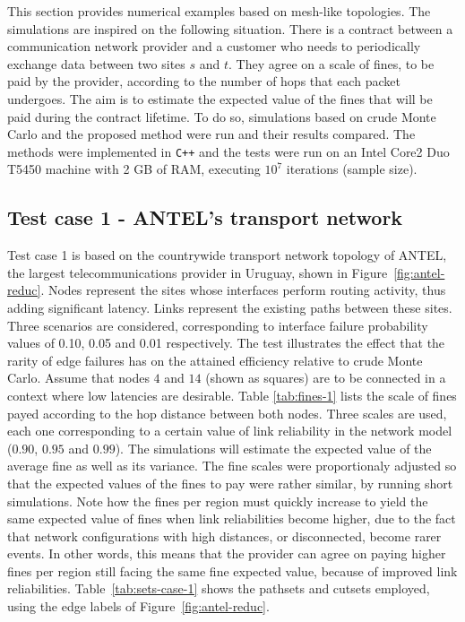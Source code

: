 \documentclass[a4paper]{article}
\begin{document}
This section provides numerical examples based on mesh-like topologies. The simulations are inspired on the following situation. There is a contract between a communication network provider and a customer who needs to periodically exchange data between two sites $s$ and $t$. They agree on a scale of fines, to be paid by the provider, according to the number of hops that each packet undergoes. The aim is to estimate the expected value of the fines that will be paid during the contract lifetime. To do so, simulations based on crude Monte Carlo and the proposed method were run and their results compared. The methods were implemented in \texttt{C++} and the tests were run on an Intel Core2 Duo T5450 machine with 2 GB of RAM, executing $10^7$ iterations (sample size).




\subsection{Test case 1 - ANTEL's transport network}

Test case 1 is based on the countrywide transport network topology of ANTEL, the largest telecommunications provider in Uruguay, shown in Figure~\ref{fig:antel-reduc}. Nodes represent the sites whose interfaces perform routing activity, thus adding significant latency. Links represent the existing paths between these sites. Three scenarios are considered, corresponding to interface failure probability values of 0.10, 0.05 and 0.01 respectively. The test illustrates the effect that the rarity of edge failures has on the attained efficiency relative to crude Monte Carlo. Assume that nodes $4$ and $14$ (shown as squares) are to be connected in a context where low latencies are desirable. Table \ref{tab:fines-1} lists the scale of fines payed according to the hop distance between both nodes. Three scales are used, each one corresponding to a certain value of link reliability in the network model ($0.90$, $0.95$ and $0.99$). The simulations will estimate the expected value of the average fine as well as its variance. The fine scales were proportionaly adjusted so that the expected values of the fines to pay were rather similar, by running short simulations. Note how the fines per region must quickly increase to yield the same expected value of fines when link reliabilities become higher, due to the fact that network configurations with high distances, or disconnected, become rarer events. In other words, this means that the provider can agree on paying higher fines per region still facing the same fine expected value, because of improved link reliabilities. Table~\ref{tab:sets-case-1} shows the pathsets and cutsets employed, using the edge labels of Figure~\ref{fig:antel-reduc}.
\end{document}
